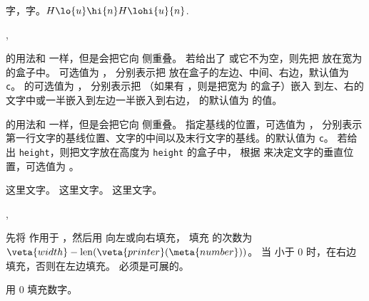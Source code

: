 \documentclass{cusdoc}
\begin{document}
\begin{xample}
\Large 字，字。$ H\lo{u}\hi{n} H\lohi{u}{n}$.
\stopxamplecode
\xampleprint
\end{xample}

\begin{function}{\makelapbox,\parlapbox}
  \begin{syntax}
    \V\makelapbox {}
    \V\makelapbox {}  
    \V\makelapbox {}   
    \V\parlapbox  {} 
    \V\parlapbox  {}    
    \V\parlapbox  {}     
  \end{syntax}

 的用法和  一样，但是会把它向  侧重叠。
若给出了  或它不为空，则先把  放在宽为  的盒子中。
 可选值为 ，
分别表示把  放在盒子的左边、中间、右边，默认值为 \texttt{c}。
 的可选值为 ，
分别表示把 （如果有 ，则是把宽为  的盒子）嵌入
到左、右的文字中或一半嵌入到左边一半嵌入到右边， 的默认值为  的值。

 的用法和  一样，但是会把它向  侧重叠。
 指定基线的位置，可选值为 ，
分别表示第一行文字的基线位置、文字的中间以及末行文字的基线。的默认值为 \texttt{c}。
若给出 \texttt{height}，则把文字放在高度为 \texttt{height} 的盒子中，
根据  来决定文字的垂直位置，可选值为 。
\end{function}

\begin{xample}
这里文字。
这里文字。
这里文字。
\stopxamplecode
\xampleprint
\end{xample}

\begin{function}[rEXP]{\numberfixedwidth,\numerzerofill}
  \begin{syntax}
    \V\numberfixedwidth {}   
    \V\numberzerofill {} 
  \end{syntax}
先将  作用于 ，然后用  向左或向右填充，
填充  的次数为 $\veta{width}-\mathrm{len}(\veta{printer}(\meta{number}))$。
当  小于 0 时，在右边填充，否则在左边填充。
 必须是可展的。

 用 0 填充数字。
\end{function}
\end{document}
